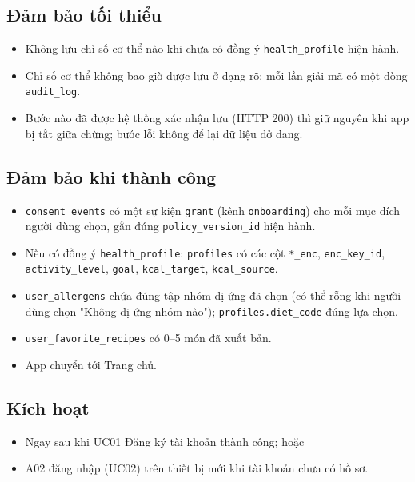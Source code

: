 \subsection{Đảm bảo tối thiểu}
\begin{itemize}
\item Không lưu chỉ số cơ thể nào khi chưa có đồng ý {\small\texttt{health\_\allowbreak{}\allowbreak{}profile}} hiện hành.
\item Chỉ số cơ thể không bao giờ được lưu ở dạng rõ; mỗi lần giải mã có một dòng {\small\texttt{audit\_\allowbreak{}\allowbreak{}log}}.
\item Bước nào đã được hệ thống xác nhận lưu (HTTP 200) thì giữ nguyên khi app bị tắt giữa chừng; bước lỗi không để lại dữ liệu dở dang.
\end{itemize}
\subsection{Đảm bảo khi thành công}
\begin{itemize}
\item {\small\texttt{consent\_\allowbreak{}\allowbreak{}events}} có một sự kiện {\small\texttt{grant}} (kênh {\small\texttt{onboarding}}) cho mỗi mục đích người dùng chọn, gắn đúng {\small\texttt{policy\_\allowbreak{}\allowbreak{}version\_\allowbreak{}\allowbreak{}id}} hiện hành.
\item Nếu có đồng ý {\small\texttt{health\_\allowbreak{}\allowbreak{}profile}}: {\small\texttt{profiles}} có các cột {\small\texttt{*\_\allowbreak{}\allowbreak{}enc}}, {\small\texttt{enc\_\allowbreak{}\allowbreak{}key\_\allowbreak{}\allowbreak{}id}}, {\small\texttt{activity\_\allowbreak{}\allowbreak{}level}}, {\small\texttt{goal}}, {\small\texttt{kcal\_\allowbreak{}\allowbreak{}target}}, {\small\texttt{kcal\_\allowbreak{}\allowbreak{}source}}.
\item {\small\texttt{user\_\allowbreak{}\allowbreak{}allergens}} chứa đúng tập nhóm dị ứng đã chọn (có thể rỗng khi người dùng chọn "Không dị ứng nhóm nào"); {\small\texttt{profiles.\allowbreak{}diet\_\allowbreak{}\allowbreak{}code}} đúng lựa chọn.
\item {\small\texttt{user\_\allowbreak{}\allowbreak{}favorite\_\allowbreak{}\allowbreak{}recipes}} có 0--5 món đã xuất bản.
\item App chuyển tới Trang chủ.
\end{itemize}
\subsection{Kích hoạt}
\begin{itemize}
\item Ngay sau khi UC01 Đăng ký tài khoản thành công; hoặc
\item A02 đăng nhập (UC02) trên thiết bị mới khi tài khoản chưa có hồ sơ.
\end{itemize}
